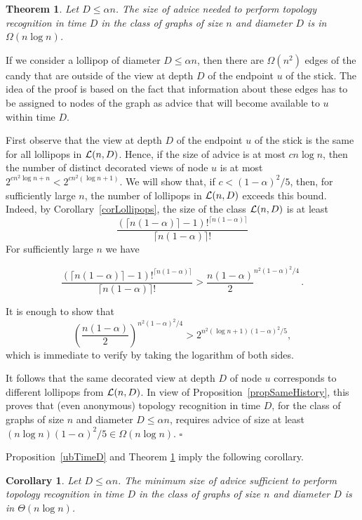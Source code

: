 \documentclass{article}
\newcommand{\cL}{{\cal L}}
\newcommand*{\qed}{\hfill\ensuremath{\square}}
\newtheorem{theorem}{Theorem}[section]
\newtheorem{corollary}{Corollary}[section]
\newenvironment{proof}{\noindent{\bf Proof:}}{\qed}
\begin{document}
\begin{theorem}\label{lbD}
Let $D\le \alpha n$.
The size of advice needed to perform topology recognition in time $D$ in the class of graphs of size $n$ and diameter $D$
is in $\Omega(n \log n)$.
\end{theorem}
\begin{proof}
If we consider a lollipop of diameter $D\le \alpha n$, then there are $\Omega(n^2)$ edges of the candy that are outside of the view at depth $D$ of the endpoint $u$ of the stick. 
The idea of the proof is based on the fact that  information about these edges has to be assigned to nodes of the graph as advice that will become available to $u$ within time $D$.


First observe that the view at depth $D$ of the endpoint $u$ of the stick is the same for all lollipops in $\cL(n,D)$.
Hence, if the size of advice is at most $c n \log n$, then the number of distinct decorated views of node $u$ is at most $2^{cn^2 \log n +n}<2^{cn^2 (\log n +1)}$.
We will show that, if {$c<(1-\alpha)^2/5$,}
then, for sufficiently large $n$, the number of lollipops in $\cL(n,D)$ exceeds this bound.
Indeed,  by Corollary~\ref{corLollipops}, the size of the class $\cL(n,D)$ is at least
{$$\frac{(\lceil n(1-\alpha) \rceil -1)!^{\lceil n(1-\alpha) \rceil}}{\lceil n(1-\alpha) \rceil !}$$}
For sufficiently large $n$ we have
\begin{small} 
{
$$ \frac{(\lceil n(1-\alpha) \rceil -1)!^{\lceil n(1-\alpha) \rceil}}{\lceil n(1-\alpha) \rceil !} > 
\frac{n(1-\alpha)}{2}^{n^2(1-\alpha)^2/4}\,.$$
}
\end{small}
It is enough to show that 
{$$ \left(\frac{n(1-\alpha)}{2}\right)^{n^2(1-\alpha)^2/4} > 2^{ n^2 (\log n +1)(1-\alpha)^2/5},$$}
which is immediate to verify by taking the logarithm of both sides.

It follows that the same decorated view at depth $D$ of node $u$ corresponds to different lollipops from $\cL(n,D)$. In view of Proposition~\ref{propSameHistory}, this proves that (even anonymous) topology recognition in time $D$, for the class of graphs of size $n$ and diameter $D\le \alpha n$, requires advice of size at least 
{$(n \log n) (1-\alpha)^2/5 \in \Omega(n \log n)$.}
\end{proof}

Proposition~\ref{ubTimeD} and Theorem \ref{lbD} imply the following corollary.
\begin{corollary}\label{corD}
Let $D\le \alpha n$.
The minimum size of advice sufficient to perform topology recognition in time $D$ in the class of graphs of size $n$ and diameter $D$
is in $\Theta(n \log n)$.
\end{corollary}
\end{document}
